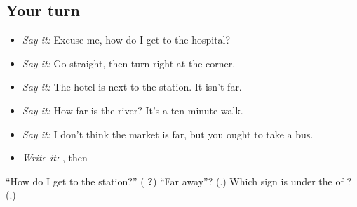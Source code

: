 \subsection*{Your turn}
\begin{itemize}
\raggedright
  \item \emph{Say it:} Excuse me, how do I get to the hospital?
  \item \emph{Say it:} Go straight, then turn right at the corner.
  \item \emph{Say it:} The hotel is next to the station. It isn't far.
  \item \emph{Say it:} How far is the river? It's a ten-minute walk.
  \item \emph{Say it:} I don't think the market is far, but you ought to take a bus.
  \item \emph{Write it:} \textbf{}, then \textbf{}
\end{itemize}

\begin{tcolorbox}[breakable,colback=teal!4,colframe=teal!35!black,title={Before you move on}]
\textquotedblleft{}How do I get to the station?\textquotedblright{} (\textbf{  ?}) \textquotedblleft{}Far away\textquotedblright{}? (\textbf{}.) Which sign is under the \textbf{} of \textbf{}? (\textbf{}.)
\end{tcolorbox}
